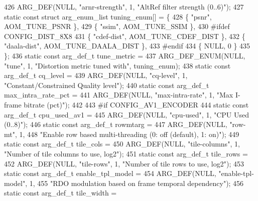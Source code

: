 \begin{DoxyCodeInclude}
{{{{{{{426     ARG\_DEF(NULL, \textcolor{stringliteral}{"arnr-strength"}, 1, \textcolor{stringliteral}{"AltRef filter strength (0..6)"});
427 \textcolor{keyword}{static} \textcolor{keyword}{const} \textcolor{keyword}{struct }arg\_enum\_list tuning\_enum[] = \{
428     \{ \textcolor{stringliteral}{"psnr"}, AOM\_TUNE\_PSNR \},
429     \{ \textcolor{stringliteral}{"ssim"}, AOM\_TUNE\_SSIM \},
430 \textcolor{preprocessor}{#ifdef CONFIG\_DIST\_8X8}
431     \{ \textcolor{stringliteral}{"cdef-dist"}, AOM\_TUNE\_CDEF\_DIST \},
432     \{ \textcolor{stringliteral}{"daala-dist"}, AOM\_TUNE\_DAALA\_DIST \},
433 \textcolor{preprocessor}{#endif}
434     \{ NULL, 0 \}
435 \};
436 \textcolor{keyword}{static} \textcolor{keyword}{const} arg\_def\_t tune\_metric =
437     ARG\_DEF\_ENUM(NULL, \textcolor{stringliteral}{"tune"}, 1, \textcolor{stringliteral}{"Distortion metric tuned with"}, tuning\_enum);
438 \textcolor{keyword}{static} \textcolor{keyword}{const} arg\_def\_t cq\_level =
439     ARG\_DEF(NULL, \textcolor{stringliteral}{"cq-level"}, 1, \textcolor{stringliteral}{"Constant/Constrained Quality level"});
440 \textcolor{keyword}{static} \textcolor{keyword}{const} arg\_def\_t max\_intra\_rate\_pct =
441     ARG\_DEF(NULL, \textcolor{stringliteral}{"max-intra-rate"}, 1, \textcolor{stringliteral}{"Max I-frame bitrate (pct)"});
442 
443 \textcolor{preprocessor}{#if CONFIG\_AV1\_ENCODER}
444 \textcolor{keyword}{static} \textcolor{keyword}{const} arg\_def\_t cpu\_used\_av1 =
445     ARG\_DEF(NULL, \textcolor{stringliteral}{"cpu-used"}, 1, \textcolor{stringliteral}{"CPU Used (0..8)"});
446 \textcolor{keyword}{static} \textcolor{keyword}{const} arg\_def\_t rowmtarg =
447     ARG\_DEF(NULL, \textcolor{stringliteral}{"row-mt"}, 1,
448         \textcolor{stringliteral}{"Enable row based multi-threading (0: off (default), 1: on)"});
449 \textcolor{keyword}{static} \textcolor{keyword}{const} arg\_def\_t tile\_cols =
450     ARG\_DEF(NULL, \textcolor{stringliteral}{"tile-columns"}, 1, \textcolor{stringliteral}{"Number of tile columns to use, log2"});
451 \textcolor{keyword}{static} \textcolor{keyword}{const} arg\_def\_t tile\_rows =
452     ARG\_DEF(NULL, \textcolor{stringliteral}{"tile-rows"}, 1, \textcolor{stringliteral}{"Number of tile rows to use, log2"});
453 \textcolor{keyword}{static} \textcolor{keyword}{const} arg\_def\_t enable\_tpl\_model =
454     ARG\_DEF(NULL, \textcolor{stringliteral}{"enable-tpl-model"}, 1,
455         \textcolor{stringliteral}{"RDO modulation based on frame temporal dependency"});
456 \textcolor{keyword}{static} \textcolor{keyword}{const} arg\_def\_t tile\_width =
}}}}}}}
\end{DoxyCodeInclude}
